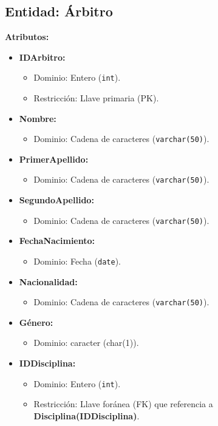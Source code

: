 \subsection*{Entidad: Árbitro}
\textbf{Atributos:}
\begin{itemize}
    \item \textbf{IDArbitro:}
    \begin{itemize}
        \item Dominio: Entero (\texttt{int}).
        \item Restricción: Llave primaria (PK).
    \end{itemize}
    \item \textbf{Nombre:}
    \begin{itemize}
        \item Dominio: Cadena de caracteres (\texttt{varchar(50)}).
    \end{itemize}
    \item \textbf{PrimerApellido:}
    \begin{itemize}
        \item Dominio: Cadena de caracteres (\texttt{varchar(50)}).
    \end{itemize}
    \item \textbf{SegundoApellido:}
    \begin{itemize}
        \item Dominio: Cadena de caracteres (\texttt{varchar(50)}).
    \end{itemize}
    \item \textbf{FechaNacimiento:}
    \begin{itemize}
        \item Dominio: Fecha (\texttt{date}).
    \end{itemize}
    \item \textbf{Nacionalidad:}
    \begin{itemize}
        \item Dominio: Cadena de caracteres (\texttt{varchar(50)}).
    \end{itemize}
    \item \textbf{Género:}
    \begin{itemize}
        \item Dominio: caracter (char(1)).
    \end{itemize}
    \item \textbf{IDDisciplina:}
    \begin{itemize}
        \item Dominio: Entero (\texttt{int}).
        \item Restricción: Llave foránea (FK) que referencia a \textbf{Disciplina(IDDisciplina)}.
    \end{itemize}
\end{itemize}

